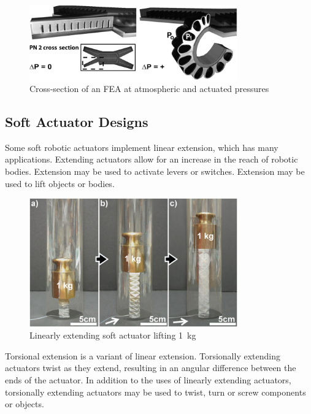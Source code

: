 \begin{figure}[H]
	\centering
	\includegraphics[width=0.8\textwidth]{FEA.png}
	\caption[Cross-section of an FEA]{Cross-section of an FEA at atmospheric and actuated pressures \citep{Shepherd2011}}
	\label{fig:fea}
\end{figure}

\subsection{Soft Actuator Designs}

Some soft robotic actuators implement linear extension, which has many applications. Extending actuators allow for an increase in the reach of robotic bodies. Extension may be used to activate levers or switches. Extension may be used to lift objects or bodies. \citep{Martinez2012}

\begin{figure}[H]
	\centering
	\includegraphics[width=0.8\textwidth]{LinearExtension.png}
	\caption[Linearly extending soft actuator]{Linearly extending soft actuator lifting \SI{1}{kg} \citep{Martinez2012}}
	\label{fig:lea}
\end{figure}

Torsional extension is a variant of linear extension. Torsionally extending actuators twist as they extend, resulting in an angular difference between the ends of the actuator. In addition to the uses of linearly extending actuators, torsionally extending actuators may be used to twist, turn or screw components or objects. \citep{Yan2018}


